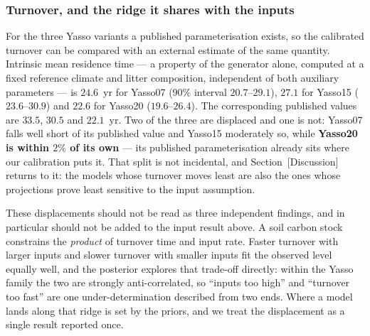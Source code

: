 \documentclass[11pt]{article}
\begin{document}
\subsubsection{Turnover, and the ridge it shares with the inputs}
For the three Yasso variants a published parameterisation exists, so the
calibrated turnover can be compared with an external estimate of the same
quantity. Intrinsic mean residence time --- a property of the generator alone,
computed at a fixed reference climate and litter composition, independent of
both auxiliary parameters --- is $24.6$~yr for Yasso07 ($90\%$ interval
$20.7$--$29.1$), $27.1$ for Yasso15 ($23.6$--$30.9$) and $22.6$ for Yasso20
($19.6$--$26.4$). The corresponding published values are $33.5$, $30.5$ and
$22.1$~yr. Two of the three are displaced and one is not: Yasso07 falls well
short of its published value and Yasso15 moderately so, while \textbf{Yasso20 is
within $2\%$ of its own} --- its published parameterisation already sits where
our calibration puts it. That split is not incidental, and Section~[Discussion]
returns to it: the models whose turnover moves least are also the ones whose
projections prove least sensitive to the input assumption.

These displacements should not be read as three independent findings, and in
particular should not be added to the input result above. A soil carbon stock
constrains the \emph{product} of turnover time and input rate. Faster turnover
with larger inputs and slower turnover with smaller inputs fit the observed
level equally well, and the posterior explores that trade-off directly: within
the Yasso family the two are strongly anti-correlated, so ``inputs too high''
and ``turnover too fast'' are one under-determination described from two ends.
Where a model lands along that ridge is set by the priors, and we treat the
displacement as a single result reported once.
\end{document}
